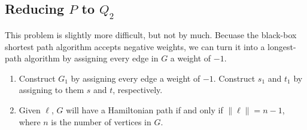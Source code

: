 \documentclass{math}
\begin{document}
\subsection*{Reducing \( P \) to \( Q_2 \)}

This problem is slightly more difficult, but not by much.  Becuase the black-box
shortest path algorithm accepts negative weights, we can turn it into a
longest-path algorithm by assigning every edge in \( G \) a weight of \( -1 \).
\begin{enumerate}
        \renewcommand{\theenumi}{\alph{enumi}}
    \item Construct \( G_1 \) by assigning every edge a weight of \( -1 \).
        Construct $s_1$ and $t_1$ by assigning to them $s$ and $t$,
        respectively.
    \item Given \( \ell \), \( G \) will have a Hamiltonian path if and only if
        \( \|\ell\| = n - 1 \), where \( n \) is the number of vertices in \( G
        \).
\end{enumerate}
\end{document}
